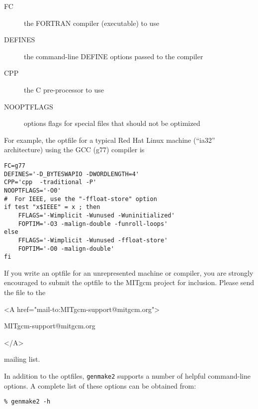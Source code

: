 \begin{description}
\item[FC] the FORTRAN compiler (executable) to use
\item[DEFINES] the command-line DEFINE options passed to the compiler
\item[CPP] the C pre-processor to use
\item[NOOPTFLAGS] options flags for special files that should not be
  optimized
\end{description}

For example, the optfile for a typical Red Hat Linux machine (``ia32''
architecture) using the GCC (g77) compiler is
\begin{verbatim}
FC=g77
DEFINES='-D_BYTESWAPIO -DWORDLENGTH=4'
CPP='cpp  -traditional -P'
NOOPTFLAGS='-O0'
#  For IEEE, use the "-ffloat-store" option
if test "x$IEEE" = x ; then
    FFLAGS='-Wimplicit -Wunused -Wuninitialized'
    FOPTIM='-O3 -malign-double -funroll-loops'
else
    FFLAGS='-Wimplicit -Wunused -ffloat-store'
    FOPTIM='-O0 -malign-double'
fi
\end{verbatim}

If you write an optfile for an unrepresented machine or compiler, you
are strongly encouraged to submit the optfile to the MITgcm project
for inclusion.  Please send the file to the
\begin{rawhtml} <A href="mail-to:MITgcm-support@mitgcm.org"> \end{rawhtml}
\begin{center}
  MITgcm-support@mitgcm.org
\end{center}
\begin{rawhtml} </A> \end{rawhtml}
mailing list.

In addition to the optfiles, \texttt{genmake2} supports a number of
helpful command-line options.  A complete list of these options can be
obtained from:
\begin{verbatim}
% genmake2 -h
\end{verbatim}

